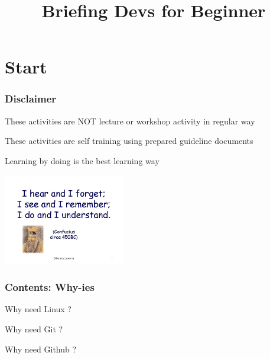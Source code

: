 \documentclass[table,dvipsnames]{beamer}
\title[Devs Beginner Guide]{Briefing Devs for Beginner}
\author{}
\date{}
\begin{document}
	\section{Start}

	\begin{frame}
	\titlepage
	\end{frame}

	\begin{frame}
		\frametitle{Disclaimer}
		\begin{exampleblock}{}
			These activities are NOT lecture or workshop activity in regular way
		\end{exampleblock}
		\begin{exampleblock}{}
			These activities are self training using prepared guideline documents 	
		\end{exampleblock}
		\begin{exampleblock}{}
			Learning by doing is the best learning way
			\begin{center}
				\includegraphics[width=150pt]{images/confucius}
			\end{center}
		\end{exampleblock}
	\end{frame}

	\begin{frame}
		\frametitle{Contents: Why-ies}
		\begin{exampleblock}{}
			Why need Linux ?
		\end{exampleblock}
		\begin{exampleblock}{}
			Why need Git ?
		\end{exampleblock}
		\begin{exampleblock}{}
			Why need Github ?
		\end{exampleblock}
	\end{frame}	
\end{document}
